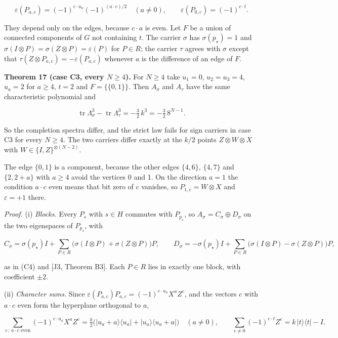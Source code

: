 \documentclass[11pt,a4paper]{article}
\begin{document}
\[\varepsilon(P_{a,c})=(-1)^{c\cdot u_a}(-1)^{(a\cdot c)/2}\quad(a\neq0),\qquad
\varepsilon(P_{0,c})=(-1)^{c\cdot t}.
\tag{E2}\]

They depend only on the edges, because \(c\cdot a\) is even. Let \(F\) be a union of connected components
of \(G\) not containing \(t\). The carrier \(\sigma\) has \(\sigma(p_\star)=1\) and
\(\sigma(I\otimes P)=\sigma(Z\otimes P)=\varepsilon(P)\) for \(P\in R\); the carrier \(\tau\) agrees with \(\sigma\)
except that \(\tau(Z\otimes P_{a,c})=-\varepsilon(P_{a,c})\) whenever \(a\) is the difference of an edge of \(F\).

\textbf{Theorem 17 (case C3, every \(N\ge4\)).} For \(N\ge4\) take \(u_1=0\), \(u_2=u_3=4\), \(u_a=2\) for
\(a\ge4\), \(t=2\) and \(F=\{\{0,1\}\}\). Then \(A_\sigma\) and \(A_\tau\) have the same characteristic polynomial and

\[\operatorname{tr}\Lambda_\sigma^3-\operatorname{tr}\Lambda_\tau^3=-\tfrac32\,k^3=-\tfrac32\,8^{N-1}.
\tag{E3}\]

So the completion spectra differ, and the strict law fails for sign carriers in case C3 for every
\(N\ge4\). The two carriers differ exactly at the \(k/2\) points \(Z\otimes W\otimes X\) with
\(W\in\{I,Z\}^{\otimes(N-2)}\).

The edge \(\{0,1\}\) is a component, because the other edges \(\{4,6\}\), \(\{4,7\}\) and \(\{2,2+a\}\) with
\(a\ge4\) avoid the vertices 0 and 1. On the direction \(a=1\) the condition \(a\cdot c\) even means that bit
zero of \(c\) vanishes, so \(P_{1,c}=W\otimes X\) and \(\varepsilon=+1\) there.

\emph{Proof.} (i) \emph{Blocks.} Every \(P_s\) with \(s\in H\) commutes with \(P_{p_\star}\), so \(A_\sigma=C_\sigma\oplus D_\sigma\) on
the two eigenspaces of \(P_{p_\star}\), with

\[C_\sigma=\sigma(p_\star)I+\sum_{P\in R}\bigl(\sigma(I\otimes P)+\sigma(Z\otimes P)\bigr)P,\qquad
D_\sigma=-\sigma(p_\star)I+\sum_{P\in R}\bigl(\sigma(I\otimes P)-\sigma(Z\otimes P)\bigr)P,\]

as in (C4) and {[}J3, Theorem B3{]}. Each \(P\in R\) lies in exactly one block, with coefficient \(\pm2\).

(ii) \emph{Character sums.} Since \(\varepsilon(P_{a,c})P_{a,c}=(-1)^{c\cdot u_a}X^aZ^c\), and the vectors \(c\) with
\(a\cdot c\) even form the hyperplane orthogonal to \(a\),

\[\sum_{c\,:\,a\cdot c\text{ even}}(-1)^{c\cdot u_a}X^aZ^c=\tfrac k2\bigl(|u_a+a\rangle\langle u_a|+|u_a\rangle\langle u_a+a|\bigr)\quad(a\neq0),
\qquad\sum_{c\neq0}(-1)^{c\cdot t}Z^c=k\,|t\rangle\langle t|-I.
\tag{E4}\]
\end{document}
